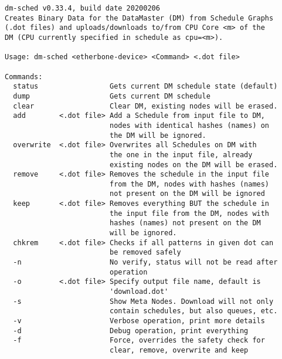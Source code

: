 \begin{lstlisting}[style = helptext]
dm-sched v0.33.4, build date 20200206
Creates Binary Data for the DataMaster (DM) from Schedule Graphs
(.dot files) and uploads/downloads to/from CPU Core <m> of the 
DM (CPU currently specified in schedule as cpu=<m>).

Usage: dm-sched <etherbone-device> <Command> <.dot file> 

Commands:
  status                 Gets current DM schedule state (default) 
  dump                   Gets current DM schedule
  clear                  Clear DM, existing nodes will be erased. 
  add        <.dot file> Add a Schedule from input file to DM, 
                         nodes with identical hashes (names) on 
                         the DM will be ignored.
  overwrite  <.dot file> Overwrites all Schedules on DM with 
                         the one in the input file, already 
                         existing nodes on the DM will be erased. 
  remove     <.dot file> Removes the schedule in the input file
                         from the DM, nodes with hashes (names) 
                         not present on the DM will be ignored 
  keep       <.dot file> Removes everything BUT the schedule in
                         the input file from the DM, nodes with
                         hashes (names) not present on the DM 
                         will be ignored.
  chkrem     <.dot file> Checks if all patterns in given dot can 
                         be removed safely
  -n                     No verify, status will not be read after 
                         operation
  -o         <.dot file> Specify output file name, default is 
                         'download.dot'
  -s                     Show Meta Nodes. Download will not only
                         contain schedules, but also queues, etc. 
  -v                     Verbose operation, print more details
  -d                     Debug operation, print everything
  -f                     Force, overrides the safety check for 
                         clear, remove, overwrite and keep
\end{lstlisting}
